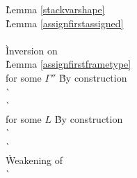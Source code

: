 \begin{description}
\begin{tabbing}
    \` Lemma \ref{stackvarshape} \\
    \` Lemma \ref{assignfirstassigned} \\
   \\
    \` Inversion on  \\
    \` Lemma \ref{assignfirstframetype} \\
   for some $\Gamma''$
    \` By construction \\
    \`  \\
    \`  \\
   for some $L$
    \` By construction \\
    \`  \\
    \`  \\

    \` Weakening of  \\

    \`  \\
  \end{tabbing}


\end{description}
